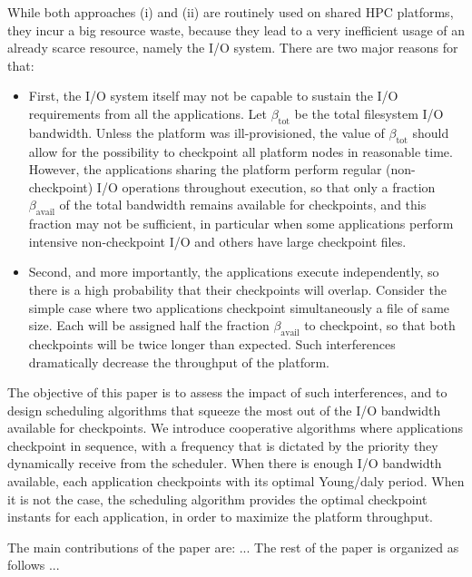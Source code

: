 \documentclass{article}
\newcommand{\bandtotal}{\beta_{\text{tot}}}
\newcommand{\bandavail}{\beta_{\text{avail}}}
\begin{document}
While both approaches (i) and (ii) are routinely used on shared HPC platforms, they incur a
big resource waste, because they lead to a very inefficient usage of an already scarce resource, namely the I/O system. There are two major reasons for that:
\begin{itemize}
\item First, the I/O system itself may not be capable to sustain the I/O requirements from all the applications. Let $\bandtotal$ be the total filesystem I/O bandwidth. Unless the platform was ill-provisioned, the value of $\bandtotal$ should allow for the possibility to checkpoint all platform nodes
in reasonable time. However, the applications sharing the platform perform regular (non-checkpoint)
I/O operations throughout execution, so that only a fraction $\bandavail$ of the total  bandwidth remains available for checkpoints, and this fraction may not be sufficient, in particular when some applications perform
intensive non-checkpoint I/O and others have large checkpoint files.
\item Second, and more importantly, the applications execute independently, so there is a high probability that their checkpoints will overlap. Consider the simple case where two applications checkpoint simultaneously a file of same size. Each will be assigned half the fraction $\bandavail$
to checkpoint, so that both checkpoints will be twice longer than expected. Such interferences dramatically decrease the throughput of the platform.
\end{itemize}

The objective of this paper is to assess the impact of such interferences, and to design scheduling algorithms that squeeze the most out of the I/O bandwidth available for checkpoints. We introduce cooperative algorithms where applications checkpoint in sequence, with a frequency that
is dictated by the priority they dynamically receive from the scheduler. When there is enough I/O bandwidth available, each application checkpoints with its optimal Young/daly period. When it is not the case, the scheduling algorithm provides the optimal checkpoint instants for each application, in order to maximize the platform throughput.

The main contributions of the paper are: ...
The rest of the paper is organized as follows ...
\end{document}

